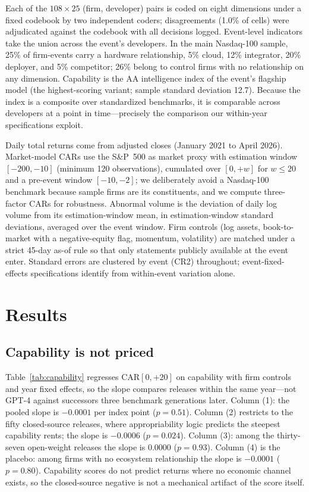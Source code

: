 \documentclass[review,12pt,authoryear]{elsarticle}
\begin{document}
Each of the $108\times25$ (firm, developer) pairs is coded on eight
dimensions under a fixed codebook by two independent coders; disagreements
(1.0\% of cells) were adjudicated against the codebook with all decisions
logged. Event-level indicators take the union across the event's developers.
In the main Nasdaq-100 sample, 25\% of firm-events carry a hardware
relationship, 5\% cloud, 12\% integrator, 20\% deployer, and 5\% competitor;
26\% belong to control firms with no relationship on any dimension.
Capability is the AA intelligence index of the event's flagship model (the
highest-scoring variant; sample standard deviation 12.7). Because the index
is a composite over standardized benchmarks, it is comparable across
developers at a point in time---precisely the comparison our within-year
specifications exploit.

Daily total returns come from adjusted closes (January 2021 to April 2026).
Market-model CARs use the S\&P~500 as market proxy with estimation window
$[-200,-10]$ (minimum 120 observations), cumulated over $[0,+w]$ for
$w\le20$ and a pre-event window $[-10,-2]$; we deliberately avoid a
Nasdaq-100 benchmark because sample firms are its constituents, and we
compute three-factor CARs for robustness. Abnormal volume is the deviation
of daily log volume from its estimation-window mean, in estimation-window
standard deviations, averaged over the event window. Firm controls (log
assets, book-to-market with a negative-equity flag, momentum, volatility)
are matched under a strict 45-day as-of rule so that only statements
publicly available at the event enter. Standard errors are clustered by
event (CR2) throughout; event-fixed-effects specifications identify from
within-event variation alone.

\section{Results}\label{sec:results}

\subsection{Capability is not priced}

Table~\ref{tab:capability} regresses CAR$[0,+20]$ on capability with firm
controls and year fixed effects, so the slope compares releases within the
same year---not GPT-4 against successors three benchmark generations later.
Column (1): the pooled slope is $-0.0001$ per index point ($p=0.51$).
Column (2) restricts to the fifty closed-source releases, where
appropriability logic predicts the steepest capability rents; the slope is
$-0.0006$ ($p=0.024$). Column (3): among the thirty-seven open-weight
releases the slope is 0.0000 ($p=0.93$). Column (4) is the placebo: among
firms with no ecosystem relationship the slope is $-0.0001$ ($p=0.80$).
Capability scores do not predict returns where no economic channel exists,
so the closed-source negative is not a mechanical artifact of the score
itself.
\end{document}
